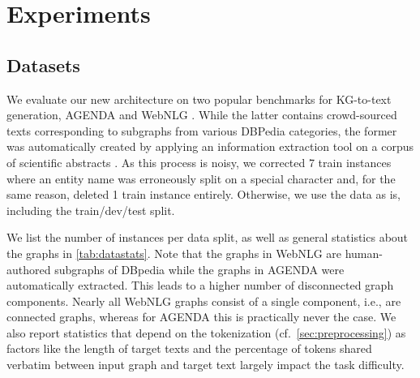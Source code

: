 \documentclass[11pt]{article}
\begin{document}
\section{Experiments}

\subsection{Datasets}
We evaluate our new architecture on two popular benchmarks
for KG-to-text generation,
AGENDA \citep{koncel-kedziorski-etal-2019-text}
and WebNLG \citep{gardent-etal-2017-webnlg}.
While the latter contains crowd-sourced texts corresponding to subgraphs from various DBPedia categories,
the former was automatically created by applying an information extraction tool \citep{luan-etal-2018-multi}
on a corpus of scientific abstracts \citep{ammar-etal-2018-construction}.
As this process is noisy,
we corrected 7 train instances where an entity name was erroneously split on a special character
and, for the same reason, deleted 1 train instance entirely.
Otherwise, we use the data as is, including the
train/dev/test split.

We list the number of instances per data split,
as well as general statistics about the graphs in \cref{tab:datastats}.
Note that the graphs in WebNLG are human-authored subgraphs of DBpedia
while the graphs in AGENDA were automatically extracted.
This leads to a higher number of disconnected graph components.
Nearly all WebNLG graphs consist of a single component,
i.e., are connected graphs,
whereas for AGENDA this is practically never the case.
We also report statistics that depend on the tokenization (cf.\ \cref{sec:preprocessing})
as factors like the length of target texts
and the percentage of tokens shared verbatim between input graph and target text
largely impact the task difficulty.
\end{document}
